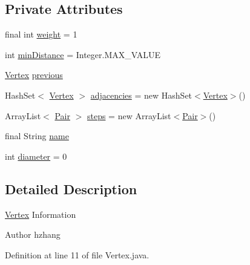 \subsection*{Private Attributes}
\begin{DoxyCompactItemize}
\item 
final int \hyperlink{classmain_1_1java_1_1com_1_1company_1_1dijkstratest_1_1_vertex_a17e38182d49640463ff2a93a55dd12d8}{weight} = 1
\item 
int \hyperlink{classmain_1_1java_1_1com_1_1company_1_1dijkstratest_1_1_vertex_a4ea46fdc17ccba35d2a35e4b70bff997}{min\-Distance} = Integer.\-M\-A\-X\-\_\-\-V\-A\-L\-U\-E
\item 
\hyperlink{classmain_1_1java_1_1com_1_1company_1_1dijkstratest_1_1_vertex}{Vertex} \hyperlink{classmain_1_1java_1_1com_1_1company_1_1dijkstratest_1_1_vertex_a748206c2f117a19e74469881e71b2415}{previous}
\item 
Hash\-Set$<$ \hyperlink{classmain_1_1java_1_1com_1_1company_1_1dijkstratest_1_1_vertex}{Vertex} $>$ \hyperlink{classmain_1_1java_1_1com_1_1company_1_1dijkstratest_1_1_vertex_acb5df443c451a3c4f11b48b4fd5a7c46}{adjacencies} = new Hash\-Set$<$\hyperlink{classmain_1_1java_1_1com_1_1company_1_1dijkstratest_1_1_vertex}{Vertex}$>$()
\item 
Array\-List$<$ \hyperlink{classmain_1_1java_1_1com_1_1company_1_1dijkstratest_1_1_pair}{Pair} $>$ \hyperlink{classmain_1_1java_1_1com_1_1company_1_1dijkstratest_1_1_vertex_a21bd658cd178bffda298570f221cdfce}{steps} = new Array\-List$<$\hyperlink{classmain_1_1java_1_1com_1_1company_1_1dijkstratest_1_1_pair}{Pair}$>$()
\item 
final String \hyperlink{classmain_1_1java_1_1com_1_1company_1_1dijkstratest_1_1_vertex_a2d3af47cee45105338487ebabe5d41af}{name}
\item 
int \hyperlink{classmain_1_1java_1_1com_1_1company_1_1dijkstratest_1_1_vertex_af5f0b296f64910fb629a69b8e39b6498}{diameter} = 0
\end{DoxyCompactItemize}


\subsection{Detailed Description}
\hyperlink{classmain_1_1java_1_1com_1_1company_1_1dijkstratest_1_1_vertex}{Vertex} Information \begin{DoxyAuthor}{Author}
hzhang 
\end{DoxyAuthor}


Definition at line 11 of file Vertex.\-java.



